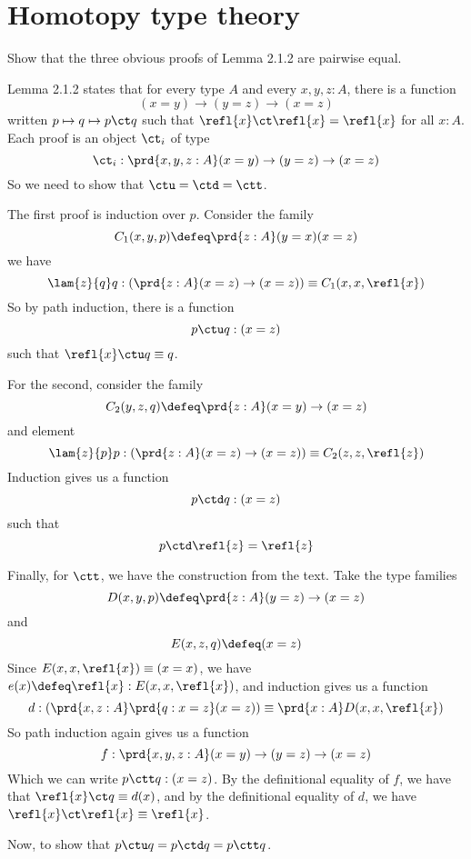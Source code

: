 \begin{coqdoccode}
\end{coqdoccode}
\section{Homotopy type theory}



Show that the three obvious proofs of Lemma 2.1.2 are pairwise equal.


 \soln
Lemma 2.1.2 states that for every type $A$ and every $x, y, z : A$, there is a
function
\[
  (x = y) \to (y = z) \to (x = z)
\]
written $p \mapsto q \mapsto p \ct q$ such that $\refl{x} \ct \refl{x} =
\refl{x}$ for all $x : A$.  Each proof is an object $\ct_{i}$ of type
\[
  \ct_{i} : \prd{x,y,z:A} (x=y)\to(y=z)\to(x=z)
\]
So we need to show that $\ctu = \ctd = \ctt$.


The first proof is induction over $p$.  Consider the family
\[
  C_{1}(x, y, p) \defeq 
  \prd{z:A} (y=x) (x=z)
\]
we have
\[
\lam{z}{q}q :
\left(\prd{z:A} (x=z) \to (x=z)\right)
  \equiv
  C_{1}(x, x, \refl{x})
\]
So by path induction, there is a function
\[
  p \ctu q : (x=z)
\]
such that $\refl{x} \ctu q \equiv q$.


For the second, consider the family
\[
  C_{2}(y, z, q) \defeq 
  \prd{z:A} (x=y) \to (x=z)
\]
and element
\[
  \lam{z}{p}p
  :
  \left(
    \prd{z:A} (x=z)\to (x=z)
  \right)
  \equiv
  C_{2}(z,z,\refl{z})
\]
Induction gives us a function
\[
  p \ctd q : (x = z)
\]
such that
\[
  p \ctd \refl{z} = \refl{z}
\]


Finally, for $\ctt$, we have the construction from the text.  Take the type
families
\[
  D(x,y,p) \defeq 
  \prd{z:A}(y=z) \to  (x=z)
\]
and
\[
  E(x, z, q) \defeq (x = z)
\]
Since $E(x,x,\refl{x}) \equiv (x=x)$, we have $e(x) \defeq \refl{x} :
E(x,x,\refl{x})$, and induction gives us a function
\[
  d : \left(\prd{x,z:A}\prd{q:x=z}(x=z)\right) 
  \equiv
  \prd{x:A}D(x, x, \refl{x})
\]
So path induction again gives us a function
\[
  f : \prd{x,y,z:A}(x=y) \to(y=z) \to (x=z)
\]
Which we can write $p \ctt q : (x=z)$.  By the definitional equality of $f$, we
have that $\refl{x} \ct q \equiv d(x)$, and by the definitional equality of
$d$, we have $\refl{x} \ct \refl{x} \equiv \refl{x}$.


Now, to show that $p \ctu q = p \ctd q = p \ctt q$.


\begin{coqdoccode}
\end{coqdoccode}
